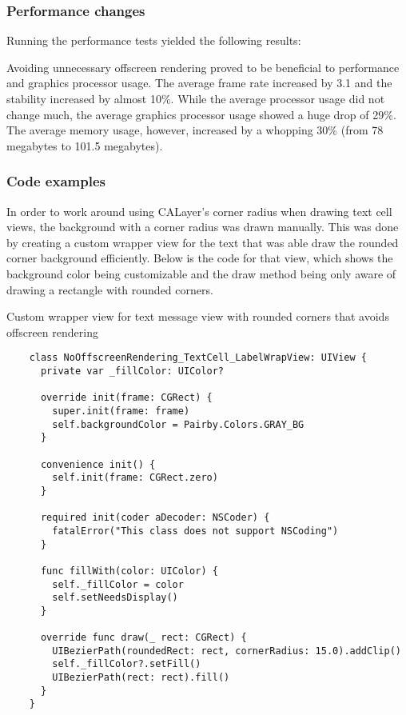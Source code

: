\documentclass[a4paper,12pt]{article}
\begin{document}
\subsubsection{Performance changes}
Running the performance tests yielded the following results:

Avoiding unnecessary offscreen rendering proved to be beneficial to performance and graphics processor usage. The average frame rate increased by 3.1 and the stability increased by almost 10\%. While the average processor usage did not change much, the average graphics processor usage showed a huge drop of 29\%. The average memory usage, however, increased by a whopping 30\% (from 78 megabytes to 101.5 megabytes). 

\subsubsection{Code examples}
In order to work around using CALayer's corner radius when drawing text cell views, the background with a corner radius was drawn manually. This was done by creating a custom wrapper view for the text that was able draw the rounded corner background efficiently. Below is the code for that view, which shows the background color being customizable and the draw method being only aware of drawing a rectangle with rounded corners.
\begin{listing}[H]
  \caption{Custom wrapper view for text message view with rounded corners that avoids offscreen rendering}
  \begin{verbatim}
    class NoOffscreenRendering_TextCell_LabelWrapView: UIView {
      private var _fillColor: UIColor?

      override init(frame: CGRect) {
        super.init(frame: frame)
        self.backgroundColor = Pairby.Colors.GRAY_BG
      }

      convenience init() {
        self.init(frame: CGRect.zero)
      }

      required init(coder aDecoder: NSCoder) {
        fatalError("This class does not support NSCoding")
      }

      func fillWith(color: UIColor) {
        self._fillColor = color
        self.setNeedsDisplay()
      }

      override func draw(_ rect: CGRect) {
        UIBezierPath(roundedRect: rect, cornerRadius: 15.0).addClip()
        self._fillColor?.setFill()
        UIBezierPath(rect: rect).fill()
      }
    }
  \end{verbatim}
\end{listing}
\end{document}
